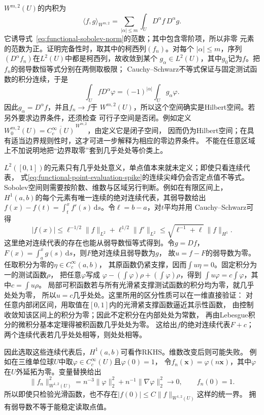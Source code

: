$W^{m,2}(U)$的内积为
\[
 \langle f,g\rangle_{W^{m,2}}
 =\sum_{|\alpha|\leq m}\int_U D^\alpha f\,D^\alpha g.
\]
它诱导式~\eqref{eq:functional-sobolev-norm}的范数；其中包含零阶项，所以非零
元素的范数为正。证明完备性时，取其中的柯西列$(f_n)$。对每个
$|\alpha|\leq m$，序列$(D^\alpha f_n)$在$L^2(U)$中都是柯西列，故收敛到某个
$g_\alpha\in L^2(U)$，其中$g_0$记为$f$。把$f_n$的弱导数恒等式分别在两侧取极限；
Cauchy--Schwarz不等式保证与固定测试函数的积分连续，于是
\[
  \int_U fD^\alpha\varphi
  =
  (-1)^{|\alpha|}\int_U g_\alpha\varphi.
\]
因此$g_\alpha=D^\alpha f$，并且$f_n\to f$于
$W^{m,2}(U)$，所以这个空间确实是Hilbert空间。若另外要求边界条件，还须检查
可行子空间是否闭。例如定义
$W_0^{m,2}(U)=\overline{C_c^\infty(U)}^{\,W^{m,2}}$，由定义它是闭子空间，
因而仍为Hilbert空间；在具有适当边界规则性时，这才可进一步解释为相应的零边界条件。
不能在任意区域上不加说明地把“边界取零”套到几乎处处等价类上。

$L^2([0,1])$的元素只有几乎处处意义，单点值本来就未定义；即使只看连续代表，
式\eqref{eq:functional-point-evaluation-spike}的连续尖峰仍会否定点值不等式。
Sobolev空间则需要按阶数、维数与区域另行判断。例如在有限区间上，
$H^1(a,b)$的每个元素有唯一连续的绝对连续代表，其弱导数给出
$f(x)-f(t)=\int_t^x f'(s)\,\mathrm ds$。令$\ell=b-a$，对$t$平均并用
Cauchy--Schwarz可得
\[
 |f(x)|\leq \ell^{-1/2}\lVert f\rVert_{L^2}
              +\ell^{1/2}\lVert f'\rVert_{L^2}
 \leq\sqrt{\ell^{-1}+\ell}\,\lVert f\rVert_{H^1}.
\]
这里绝对连续代表的存在也能从弱导数恒等式得到。令$g=Df$，
$F(x)=\int_a^x g(s)\,\mathrm ds$，则$F$绝对连续且弱导数为$g$，
故$u=f-F$的弱导数为零。任取积分为零的$\eta\in C_c^\infty(a,b)$，
其原函数仍紧支撑，因而$\int u\eta=0$。固定积分为一的测试函数$\rho$，
把任意$\varphi$写成
$\varphi-(\int\varphi)\rho+(\int\varphi)\rho$，得到
$\int u\varphi=c\int\varphi$，其中$c=\int u\rho$。
局部可积函数若与所有光滑紧支撑测试函数的积分均为零，就几乎处处为零，
所以$u=c$几乎处处。这里所用的区分性质可以在一维直接验证：
对任意内部闭区间，用取值在$[0,1]$内的光滑紧支撑函数逼近其示性函数，
由控制收敛知该区间上的积分为零；因此不定积分在内部处处为常数，
再由Lebesgue积分的微积分基本定理得被积函数几乎处处为零。
这给出$f$的绝对连续代表$F+c$；
两个连续代表若几乎处处相等，则处处相等。

因此选取这些连续代表后，$H^1(a,b)$可看作RKHS。维数改变后则可能失败。
例如在三维单位球$U$中取$\varphi\in C_c^\infty(U)$且$\varphi(0)=1$，
令$f_n(\bm x)=\varphi(n\bm x)$，其中$\varphi$在$U$外延拓为零。变量替换给出
\[
 \lVert f_n\rVert_{W^{1,2}(U)}^2
 =n^{-3}\lVert\varphi\rVert_2^2+
   n^{-1}\lVert\nabla\varphi\rVert_2^2\longrightarrow0,
 \qquad f_n(0)=1.
\]
所以即使只检验光滑函数，也不存在$|f(0)|\leq C\lVert f\rVert_{W^{1,2}(U)}$这样的统一界。
拥有弱导数不等于能稳定读取点值。


